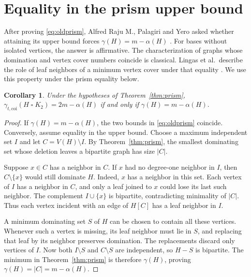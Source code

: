 \documentclass[11pt,a4paper]{article}
\newtheorem{corollary}[theorem]{Corollary}
\newcommand{\coi}{\gamma_{t,\mathrm{coi}}}
\newcommand{\boxprod}{\mathbin{\square}}
\begin{document}
\section{Equality in the prism upper bound}

After proving \eqref{eq:oldprism}, Alfred Raju M., Palagiri and Yero
asked whether attaining its upper bound forces $\gamma(H)=m-\alpha(H)$
\cite[Section 5.1, p.~341]{italian}. For bases without isolated vertices,
the answer is affirmative. The characterization of graphs whose domination and
vertex cover numbers coincide is classical. Lingas et al.\ describe the
role of leaf neighbors of a minimum vertex cover under that equality
\cite[Theorem 1]{lingas}. We use this property under the prism equality below.

\begin{corollary}\label{cor:upper}
Under the hypotheses of Theorem~\ref{thm:prism},
$\coi(H\boxprod K_2)=2m-\alpha(H)$ if and only if
$\gamma(H)=m-\alpha(H)$.
\end{corollary}

\begin{proof}
If $\gamma(H)=m-\alpha(H)$, the two bounds in \eqref{eq:oldprism}
coincide. Conversely, assume equality in the upper bound. Choose a
maximum independent set $I$ and let $C=V(H)\setminus I$. By
Theorem~\ref{thm:prism}, the smallest dominating set whose deletion
leaves a bipartite graph has size $|C|$.

Suppose $x\in C$ has a neighbor in $C$. If $x$ had no degree-one
neighbor in $I$, then $C\setminus\{x\}$ would still dominate $H$.
Indeed, $x$ has a neighbor in this set. Each vertex of $I$ has a neighbor
in $C$, and only a leaf joined to $x$ could lose its last such neighbor.
The complement
$I\cup\{x\}$ is bipartite, contradicting minimality of $|C|$.
Thus each vertex incident with an edge of $H[C]$ has a leaf neighbor in $I$.

A minimum dominating set $S$ of $H$ can be chosen to contain all these
vertices. Whenever such a vertex is missing, its leaf neighbor must lie in
$S$, and replacing that leaf by its neighbor preserves domination.
The replacements discard only vertices of $I$. Now both $I\setminus S$
and $C\setminus S$ are independent, so $H-S$ is bipartite. The minimum
in Theorem~\ref{thm:prism} is therefore $\gamma(H)$, proving
$\gamma(H)=|C|=m-\alpha(H)$.
\end{proof}
\end{document}
